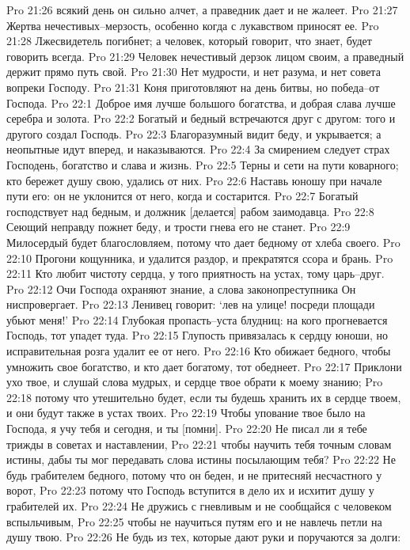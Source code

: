 Pro 21:26  всякий день он сильно алчет, а праведник дает и не жалеет.
Pro 21:27  Жертва нечестивых--мерзость, особенно когда с лукавством приносят ее.
Pro 21:28  Лжесвидетель погибнет; а человек, который говорит, что знает, будет говорить всегда.
Pro 21:29  Человек нечестивый дерзок лицом своим, а праведный держит прямо путь свой.
Pro 21:30  Нет мудрости, и нет разума, и нет совета вопреки Господу.
Pro 21:31  Коня приготовляют на день битвы, но победа--от Господа.
Pro 22:1  Доброе имя лучше большого богатства, и добрая слава лучше серебра и золота.
Pro 22:2  Богатый и бедный встречаются друг с другом: того и другого создал Господь.
Pro 22:3  Благоразумный видит беду, и укрывается; а неопытные идут вперед, и наказываются.
Pro 22:4  За смирением следует страх Господень, богатство и слава и жизнь.
Pro 22:5  Терны и сети на пути коварного; кто бережет душу свою, удались от них.
Pro 22:6  Наставь юношу при начале пути его: он не уклонится от него, когда и состарится.
Pro 22:7  Богатый господствует над бедным, и должник [делается] рабом заимодавца.
Pro 22:8  Сеющий неправду пожнет беду, и трости гнева его не станет.
Pro 22:9  Милосердый будет благословляем, потому что дает бедному от хлеба своего.
Pro 22:10  Прогони кощунника, и удалится раздор, и прекратятся ссора и брань.
Pro 22:11  Кто любит чистоту сердца, у того приятность на устах, тому царь--друг.
Pro 22:12  Очи Господа охраняют знание, а слова законопреступника Он ниспровергает.
Pro 22:13  Ленивец говорит: `лев на улице! посреди площади убьют меня!'
Pro 22:14  Глубокая пропасть--уста блудниц: на кого прогневается Господь, тот упадет туда.
Pro 22:15  Глупость привязалась к сердцу юноши, но исправительная розга удалит ее от него.
Pro 22:16  Кто обижает бедного, чтобы умножить свое богатство, и кто дает богатому, тот обеднеет.
Pro 22:17  Приклони ухо твое, и слушай слова мудрых, и сердце твое обрати к моему знанию;
Pro 22:18  потому что утешительно будет, если ты будешь хранить их в сердце твоем, и они будут также в устах твоих.
Pro 22:19  Чтобы упование твое было на Господа, я учу тебя и сегодня, и ты [помни].
Pro 22:20  Не писал ли я тебе трижды в советах и наставлении,
Pro 22:21  чтобы научить тебя точным словам истины, дабы ты мог передавать слова истины посылающим тебя?
Pro 22:22  Не будь грабителем бедного, потому что он беден, и не притесняй несчастного у ворот,
Pro 22:23  потому что Господь вступится в дело их и исхитит душу у грабителей их.
Pro 22:24  Не дружись с гневливым и не сообщайся с человеком вспыльчивым,
Pro 22:25  чтобы не научиться путям его и не навлечь петли на душу твою.
Pro 22:26  Не будь из тех, которые дают руки и поручаются за долги:

